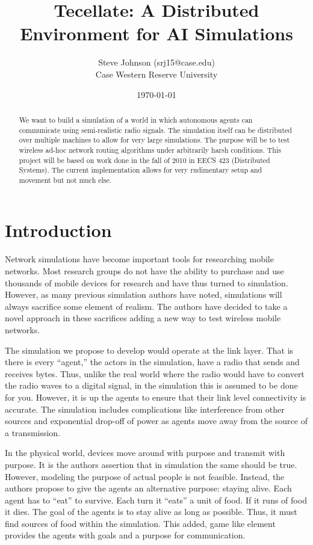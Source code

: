 \documentclass[12pt]{article}
\title{Tecellate: A Distributed Environment for AI Simulations}
\author{
        Steve Johnson (srj15@case.edu)\\
        Case Western Reserve University\\
}
\date{\today}
\begin{document}
\doublespacing
\maketitle


\begin{abstract}
    We want to build a simulation of a world in which autonomous agents can communicate using semi-realistic radio signals. The simulation itself can be distributed over multiple machines to allow for very large simulations. The purpose will be to test wireless ad-hoc network routing algorithms under arbitrarily harsh conditions.
    This project will be based on work done in the fall of 2010 in EECS 423 (Distributed Systems). The current implementation allows for very rudimentary setup and movement but not much else.
\end{abstract}

\section{Introduction}

Network simulations have become important tools for researching mobile networks. Most research groups do not have the ability to purchase and use thousands of mobile devices for research and have thus turned to simulation. However, as many previous simulation authors have noted, simulations will always sacrifice some element of realism. The authors have decided to take a novel approach in these sacrifices adding a new way to test wireless mobile networks.

The simulation we propose to develop would operate at the link layer. That is there is every ``agent,'' the actors in the simulation, have a radio that sends and receives bytes. Thus, unlike the real world where the radio would have to convert the radio waves to a digital signal, in the simulation this is assumed to be done for you. However, it is up the agents to ensure that their link level connectivity is accurate. The simulation includes complications like interference from other sources and exponential drop-off of power as agents move away from the source of a transmission.

In the physical world, devices move around with purpose and transmit with purpose. It is the authors assertion that in simulation the same should be true. However, modeling the purpose of actual people is not feasible. Instead, the authors propose to give the agents an alternative purpose: staying alive. Each agent has to ``eat'' to survive. Each turn it ``eats'' a unit of food. If it runs of food it dies. The goal of the agents is to stay alive as long as possible. Thus, it must find sources of food within the simulation. This added, game like element provides the agents with goals and a purpose for communication.
\end{document}
